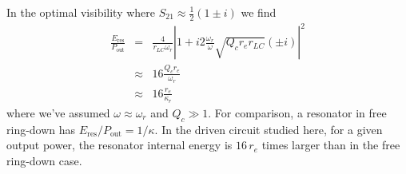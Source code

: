 In the optimal visibility where $S_{21}\approx\frac{1}{2}\left(1 \pm i \right)$ we find \begin{eqnarray}
\frac{E_{\text{res}}}{P_{\text{out}}} &=& \frac{4}{r_{LC}\omega_r}\left| 1 + i2\frac{\omega_r}{\omega} \sqrt{Q_c r_e r_{LC}}(\pm i) \right|^2 \nonumber \\
& \approx & 16 \frac{Q_c r_e }{\omega_r}\nonumber \\
& \approx & 16 \frac{r_e}{\kappa_r} \label{eq:sec:resonatorEnergyToOutputPowerRatio:ratio_lambda4_optimal} \end{eqnarray}
where we've assumed $\omega \approx \omega_r$ and $Q_c \gg 1$.
For comparison, a resonator in free ring-down has $E_{\text{res}}/P_{\text{out}} = 1/\kappa$.
In the driven circuit studied here, for a given output power, the resonator internal energy is $16 \, r_e$ times larger than in the free ring-down case.
